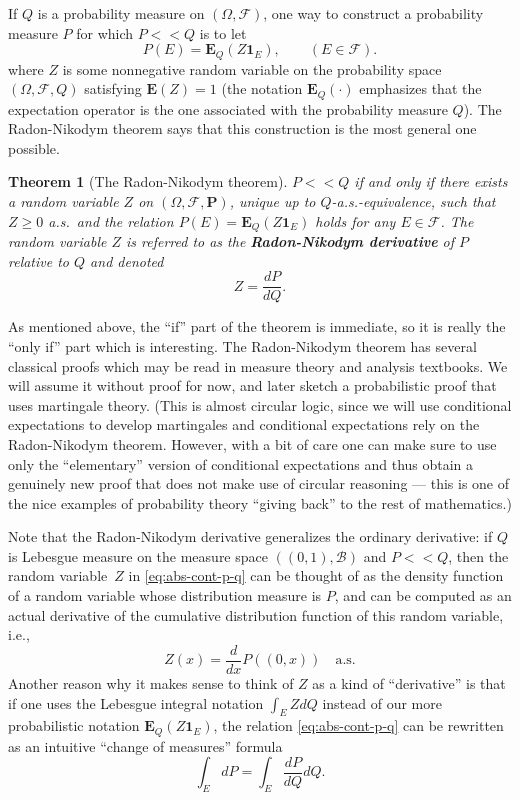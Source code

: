 \documentclass[12pt]{article}
\newtheorem{thm}{Theorem}[section]
\newcommand{\prob}{\mathbf{P}}
\newcommand{\expec}{\mathbf{E}}
\newcommand{\ind}{\textbf{1}}
\theoremstyle{example}
\begin{document}
If $Q$ is a probability measure on $(\Omega, \mathcal{F})$, one way to construct a probability measure $P$ for which $P<<Q$ is to let
\begin{equation}\label{eq:abs-cont-p-q}
P(E) = \expec_Q(Z \ind_E), \qquad (E\in \mathcal{F}).
\end{equation}
where $Z$ is some nonnegative random variable on the probability space $(\Omega,\mathcal{F},Q)$ satisfying $\expec(Z)=1$ (the notation $\expec_Q(\cdot)$ emphasizes that the expectation operator is the one associated with the probability measure $Q$). The Radon-Nikodym theorem says that this construction is the most general one possible.

\begin{thm}[The Radon-Nikodym theorem] $P<<Q$ if and only if there exists a random variable $Z$ on $(\Omega, \mathcal{F}, \prob)$, unique up to $Q$-a.s.-equivalence, such that $Z\ge 0$ a.s.\ and the relation $P(E) = \expec_Q (Z \ind_E)$ holds for any $E\in \mathcal{F}$. The random variable $Z$ is referred to as the \textbf{Radon-Nikodym derivative} of $P$ relative to $Q$ and denoted $$Z = \frac{dP}{dQ}. $$
\end{thm}

As mentioned above, the ``if'' part of the theorem is immediate, so it is really the ``only if'' part which is interesting. The Radon-Nikodym theorem has several classical proofs which may be read in measure theory and analysis textbooks. We will assume it without proof for now, and later sketch a probabilistic proof that uses martingale theory. (This is almost circular logic, since we will use conditional expectations to develop martingales and conditional expectations rely on the Radon-Nikodym theorem. However, with a bit of care one can make sure to use only the ``elementary'' version of conditional expectations and thus obtain a genuinely new proof that does not make use of circular reasoning --- this is one of the nice examples of probability theory ``giving back'' to the rest of mathematics.)

Note that the Radon-Nikodym derivative generalizes the ordinary derivative: if $Q$ is Lebesgue measure on the measure space $((0,1),\mathcal{B})$ and $P<<Q$, then the random variable~$Z$ in \eqref{eq:abs-cont-p-q} can be thought of as the density function of a random variable whose distribution measure is $P$, and can be computed as an actual derivative of the cumulative distribution function of this random variable, i.e.,
$$ Z(x) = \frac{d}{dx} P((0,x)) \quad\textrm{a.s.} $$
Another reason why it makes sense to think of $Z$ as a kind of ``derivative'' is that if one uses the Lebesgue integral notation $\int_E Z dQ$ instead of our more probabilistic notation $\expec_Q(Z\ind_E)$, the relation \eqref{eq:abs-cont-p-q} can be rewritten as an intuitive ``change of measures'' formula
\begin{equation} \label{eq:abs-cont-change-var} 
\int_E dP = \int_E \frac{dP}{dQ} dQ.
\end{equation}
\end{document}
